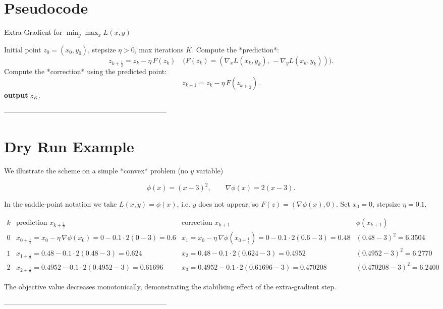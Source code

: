 \documentclass{article}
\begin{document}
\section*{Pseudocode}
\begin{algorithm}[H]
\caption{Extra‑Gradient for $\displaystyle\min_{y}\max_{x}L(x,y)$}
\begin{algorithmic}[1]
\Require Initial point $z_0=(x_0,y_0)$, stepsize $\eta>0$, max iterations $K$.
    \State Compute the *prediction*:
    \[
    z_{k+\frac12}=z_k-\eta\,F(z_k)
    \quad\bigl(F(z_k)=
    (\nabla_x L(x_k,y_k),\,-\nabla_y L(x_k,y_k))\bigr).
    \]
    \State Compute the *correction* using the predicted point:
    \[
    z_{k+1}=z_k-\eta\,F(z_{k+\frac12}).
    \]
\EndFor
\State \textbf{output} $z_K$.
\end{algorithmic}
\end{algorithm}

---------------------------------------------------------------------

\section*{Dry Run Example}
We illustrate the scheme on a simple *convex* problem (no $y$ variable)  

\[
\phi(x)= (x-3)^2,\qquad \nabla\phi(x)=2(x-3).
\]

In the saddle‑point notation we take $L(x,y)=\phi(x)$, i.e. $y$ does not appear, so $F(z)=(\nabla\phi(x),0)$.  
Set $x_0=0$, stepsize $\eta=0.1$.  

\[
\begin{array}{c|c|c|c}
k & \text{prediction }x_{k+\frac12} & \text{correction }x_{k+1} & \phi(x_{k+1})\\ \hline
0 &
x_{0+\frac12}=x_0-\eta\,\nabla\phi(x_0)
=0-0.1\cdot 2(0-3)=0.6 &
x_{1}=x_0-\eta\,\nabla\phi(x_{0+\frac12})
=0-0.1\cdot 2(0.6-3)=0.48 &
(0.48-3)^2=6.3504\\ \hline
1 &
x_{1+\frac12}=0.48-0.1\cdot2(0.48-3)=0.624 &
x_{2}=0.48-0.1\cdot2(0.624-3)=0.4952 &
(0.4952-3)^2=6.2770\\ \hline
2 &
x_{2+\frac12}=0.4952-0.1\cdot2(0.4952-3)=0.61696 &
x_{3}=0.4952-0.1\cdot2(0.61696-3)=0.470208 &
(0.470208-3)^2=6.2400
\end{array}
\]

The objective value decreases monotonically, demonstrating the stabilising effect of the extra‑gradient step.

---------------------------------------------------------------------
\end{document}
